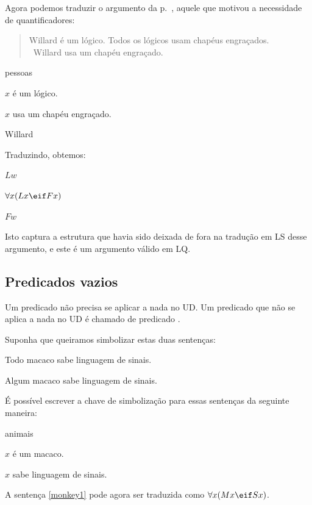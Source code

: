 Agora podemos traduzir o argumento da p.~\pageref{willard1}, aquele que motivou a necessidade de quantificadores:
\begin{quote}
Willard é um lógico. Todos os lógicos usam chapéus engraçados.\\
\therefore\ Willard usa um chapéu engraçado.
\end{quote}
\begin{ekey}
\item[UD:] pessoas
\item[Lx:] $x$ é um lógico.
\item[Fx:] $x$ usa um chapéu engraçado.
\item[w:] Willard
\end{ekey}
Traduzindo, obtemos:
\begin{earg}
\item[] $Lw$
\item[] $\forall x(Lx \eif Fx)$
\item[\therefore] $Fw$
\end{earg}

Isto captura a estrutura que havia sido deixada de fora na tradução em LS desse argumento, e este é um argumento válido em LQ.






\subsection{Predicados vazios}
Um predicado não precisa se aplicar a nada no UD. Um predicado que não se aplica a nada no UD é chamado de predicado .

Suponha que queiramos simbolizar estas duas sentenças:
\begin{earg}
\item[\ex{monkey1}]Todo macaco sabe linguagem de sinais.
\item[\ex{monkey2}]Algum macaco sabe linguagem de sinais.
\end{earg}
É possível escrever a chave de simbolização para essas sentenças da seguinte maneira:
\begin{ekey}
\item[UD:] animais
\item[Mx:] $x$ é um macaco.
\item[Sx:] $x$ sabe linguagem de sinais.
\end{ekey}

A sentença \ref{monkey1} pode agora ser traduzida como $\forall x(Mx \eif Sx)$.

